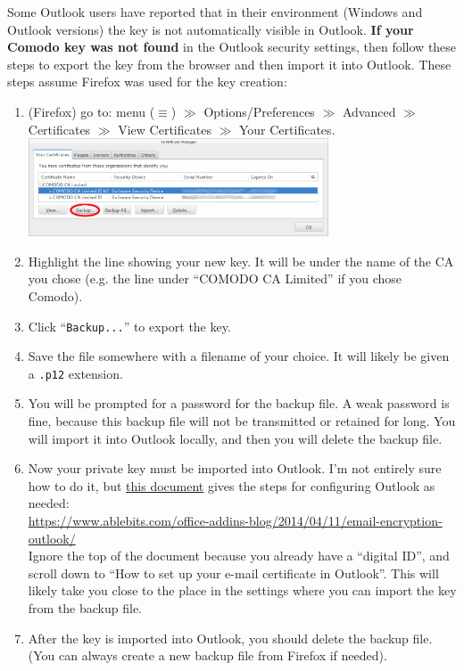 \documentclass[pdftex,12pt,titlepage=false]{scrartcl}
\begin{document}
Some Outlook users have reported that in their environment (Windows
and Outlook versions) the key is not automatically visible in Outlook.
\textbf{If your Comodo key was not found} in the Outlook security
settings, then follow these steps to export the key from the browser
and then import it into Outlook.  These steps assume Firefox was used
for the key creation:

\begin{enumerate}
  \item (Firefox) go to: menu ($\equiv$) $\gg$ Options/Preferences $\gg$ Advanced
  $\gg$ Certificates $\gg$ View Certificates $\gg$ Your Certificates.\\[1em]%
  \includegraphics[width=0.7\textwidth]{images/firefox_cert_settings.png}
\item Highlight the line showing your new key.  It will be under the
  name of the CA you chose (e.g. the line under ``COMODO CA Limited''
  if you chose Comodo).
\item %
  Click ``\texttt{Backup...}'' to export the key.
\item Save the file somewhere with a filename of your choice.  It will
  likely be given a \verb|.p12| extension.
\item\label{makebupw} You will be prompted for a password for the
  backup file.  A weak password is fine, because this backup file will
  not be transmitted or retained for long.  You will import it into
  Outlook locally, and then you will delete the backup file.
\item Now your private key must be imported into Outlook.  I'm not
  entirely sure how to do it, but
  \href{https://www.ablebits.com/office-addins-blog/2014/04/11/email-encryption-outlook/}{this
    document} gives the steps for configuring Outlook as needed:\\
  \url{https://www.ablebits.com/office-addins-blog/2014/04/11/email-encryption-outlook/}\\
  Ignore the top of the document because you already have a ``digital
  ID'', and scroll down to ``How to set up your e-mail certificate in
  Outlook''.  This will likely take you close to the place in the
  settings where you can import the key from the backup file.
\item After the key is imported into Outlook, you should delete the
  backup file.  (You can always create a new backup file from Firefox
  if needed).
\end{enumerate}
\end{document}
